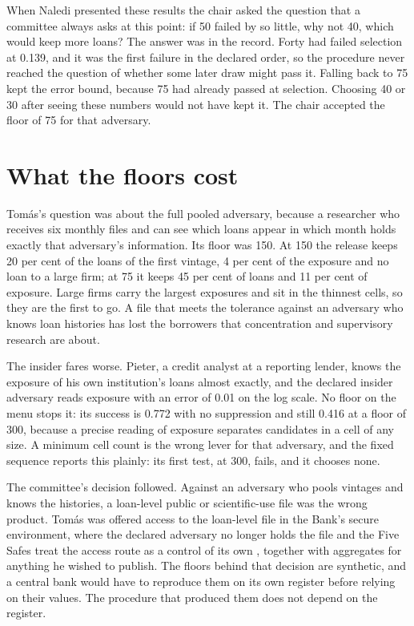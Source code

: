When Naledi presented these results the chair asked the question that a committee always
asks at this point: if 50 failed by so little, why not 40, which would keep more loans?
The answer was in the record. Forty had failed selection at 0.139, and it was the first
failure in the declared order, so the procedure never reached the question of whether
some later draw might pass it. Falling back to 75 kept the error bound, because 75 had
already passed at selection. Choosing 40 or 30 after seeing these numbers would not have
kept it. The chair accepted the floor of 75 for that adversary.

\section{What the floors cost}

Tomás's question was about the full pooled adversary, because a researcher who receives
six monthly files and can see which loans appear in which month holds exactly that
adversary's information. Its floor was 150. At 150 the release keeps 20 per cent of the
loans of the first vintage, 4 per cent of the exposure and no loan to a large firm; at
75 it keeps 45 per cent of loans and 11 per cent of exposure.
Large firms carry the largest exposures and sit in the thinnest cells, so they are the
first to go. A file that meets the tolerance against an adversary who knows loan
histories has lost the borrowers that concentration and supervisory research are about.

The insider fares worse. Pieter, a credit analyst at a reporting lender, knows the
exposure of his own institution's loans almost exactly, and the declared insider
adversary reads exposure with an error of 0.01 on the log scale. No floor on the menu
stops it: its success is 0.772 with no suppression and still 0.416 at a floor of 300,
because a precise reading of exposure separates candidates in a cell of any size.
A minimum cell count is the wrong lever for that adversary, and the fixed sequence
reports this plainly: its first test, at 300, fails, and it chooses none.

The committee's decision followed. Against an adversary who pools vintages and knows
the histories, a loan-level public or scientific-use file was the wrong product. Tomás
was offered access to the loan-level file in the Bank's secure environment, where the
declared adversary no longer holds the file and the Five Safes treat the access route as
a control of its own \citep{desai2016}, together with aggregates for anything he wished
to publish. The floors behind that decision are synthetic, and a central bank would have
to reproduce them on its own register before relying on their values. The procedure that
produced them does not depend on the register.

